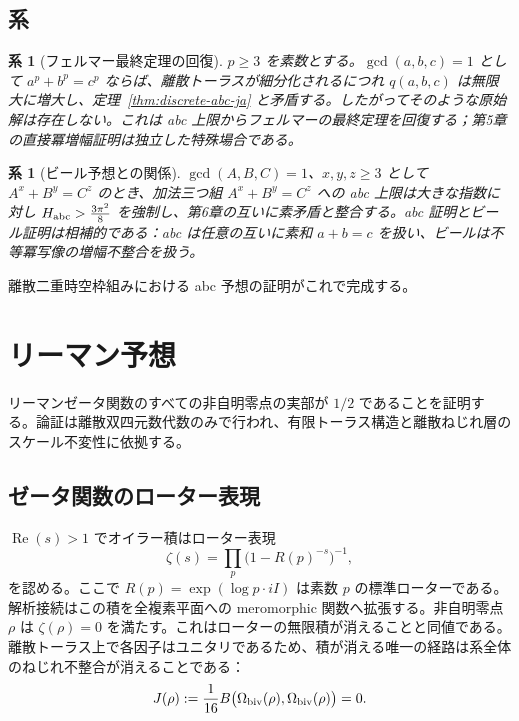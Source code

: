 \documentclass[dvipdfmx,a4paper]{article}
\newtheorem{corollary}[theorem]{系}
\theoremstyle{definition}
\theoremstyle{remark}
\newcommand{\Jbound}{\frac{3\pi^2}{8}}
\begin{document}
\subsection{系}

\begin{corollary}[フェルマー最終定理の回復]
\label{cor:abc-flt-ja}
$p \geq 3$ を素数とする。$\gcd(a,b,c) = 1$ として $a^p + b^p = c^p$ ならば、離散トーラスが細分化されるにつれ $q(a,b,c)$ は無限大に増大し、定理~\ref{thm:discrete-abc-ja} と矛盾する。したがってそのような原始解は存在しない。これは abc 上限からフェルマーの最終定理を回復する；第5章の直接冪増幅証明は独立した特殊場合である。
\end{corollary}

\begin{corollary}[ビール予想との関係]
\label{cor:abc-beal-ja}
$\gcd(A,B,C) = 1$、$x,y,z \geq 3$ として $A^x + B^y = C^z$ のとき、加法三つ組 $A^x + B^y = C^z$ への abc 上限は大きな指数に対し $H_{\rm abc} > \Jbound$ を強制し、第6章の互いに素矛盾と整合する。abc 証明とビール証明は相補的である：abc は任意の互いに素和 $a + b = c$ を扱い、ビールは不等冪写像の増幅不整合を扱う。
\end{corollary}

離散二重時空枠組みにおける abc 予想の証明がこれで完成する。

\section{リーマン予想}

リーマンゼータ関数のすべての非自明零点の実部が $1/2$ であることを証明する。論証は離散双四元数代数のみで行われ、有限トーラス構造と離散ねじれ層のスケール不変性に依拠する。

\subsection{ゼータ関数のローター表現}

$\operatorname{Re}(s) > 1$ でオイラー積はローター表現
\[
\zeta(s) = \prod_p \bigl(1 - R(p)^{-s}\bigr)^{-1},
\]
を認める。ここで $R(p) = \exp(\log p \cdot iI)$ は素数 $p$ の標準ローターである。解析接続はこの積を全複素平面への meromorphic 関数へ拡張する。非自明零点 $\rho$ は $\zeta(\rho) = 0$ を満たす。これはローターの無限積が消えることと同値である。離散トーラス上で各因子はユニタリであるため、積が消える唯一の経路は系全体のねじれ不整合が消えることである：
\[
J(\rho) := \frac{1}{16} B\bigl(\Omega_{\rm biv}(\rho), \Omega_{\rm biv}(\rho)\bigr) = 0.
\]
\end{document}
